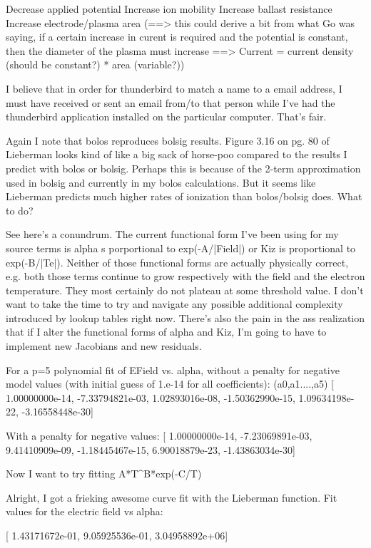 {Decrease applied potential
Increase ion mobility
Increase ballast resistance
Increase electrode/plasma area (==> this could derive a bit from what Go was saying, if a certain increase in curent is required and the potential is constant, then the diameter of the plasma must increase ==> Current = current density (should be constant?) * area (variable?))

I believe that in order for thunderbird to match a name to a email address, I must have received or sent an email from/to that person while I've had the thunderbird application installed on the particular computer. That's fair.

Again I note that bolos reproduces bolsig results. Figure 3.16 on pg. 80 of Lieberman looks kind of like a big sack of horse-poo compared to the results I predict with bolos or bolsig. Perhaps this is because of the 2-term approximation used in bolsig and currently in my bolos calculations. But it seems like Lieberman predicts much higher rates of ionization than bolos/bolsig does. What to do?

See here's a conundrum. The current functional form I've been using for my source terms is alpha s porportional to exp(-A/|Field|) or Kiz is proportional to exp(-B/|Te|). Neither of those functional forms are actually physically correct, e.g. both those terms continue to grow respectively with the field and the electron temperature. They most certainly do not plateau at some threshold value. I don't want to take the time to try and navigate any possible additional complexity introduced by lookup tables right now. There's also the pain in the ass realization that if I alter the functional forms of alpha and Kiz, I'm going to have to implement new Jacobians and new residuals.

For a p=5 polynomial fit of EField vs. alpha, without a penalty for negative model values (with initial guess of 1.e-14 for all coefficients): (a0,a1....,a5)
[  1.00000000e-14,  -7.33794821e-03,   1.02893016e-08,
        -1.50362990e-15,   1.09634198e-22,  -3.16558448e-30]

With a penalty for negative values:
[  1.00000000e-14,  -7.23069891e-03,   9.41410909e-09,
        -1.18445467e-15,   6.90018879e-23,  -1.43863034e-30]

Now I want to try fitting A*T^B*exp(-C/T)

Alright, I got a frieking awesome curve fit with the Lieberman function. Fit values for the electric field vs alpha:

[  1.43171672e-01,   9.05925536e-01,   3.04958892e+06]

}
